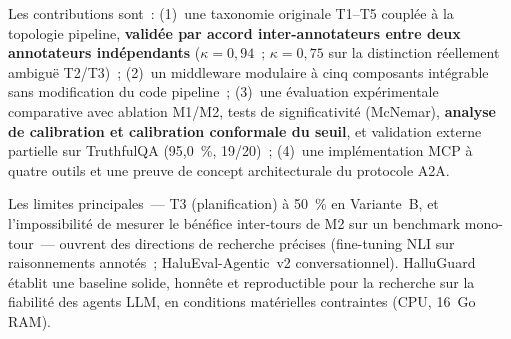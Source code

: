 \documentclass[12pt,a4paper]{article}
\begin{document}
Les contributions sont~: (1)~une taxonomie originale T1--T5 couplée à la topologie pipeline, \textbf{validée par accord inter-annotateurs entre deux annotateurs indépendants} ($\kappa=0{,}94$~; $\kappa=0{,}75$ sur la distinction réellement ambiguë T2/T3)~; (2)~un middleware modulaire à cinq composants intégrable sans modification du code pipeline~; (3)~une évaluation expérimentale comparative avec ablation M1/M2, tests de significativité (McNemar), \textbf{analyse de calibration et calibration conformale du seuil}, et validation externe partielle sur TruthfulQA (95,0~\%, 19/20)~; (4)~une implémentation MCP à quatre outils et une preuve de concept architecturale du protocole A2A.

Les limites principales~--- T3 (planification) à 50~\% en Variante~B, et l'impossibilité de mesurer le bénéfice inter-tours de M2 sur un benchmark mono-tour~--- ouvrent des directions de recherche précises (fine-tuning NLI sur raisonnements annotés~; HaluEval-Agentic~v2 conversationnel). HalluGuard établit une baseline solide, honnête et reproductible pour la recherche sur la fiabilité des agents LLM, en conditions matérielles contraintes (CPU, 16~Go RAM).
\end{document}
